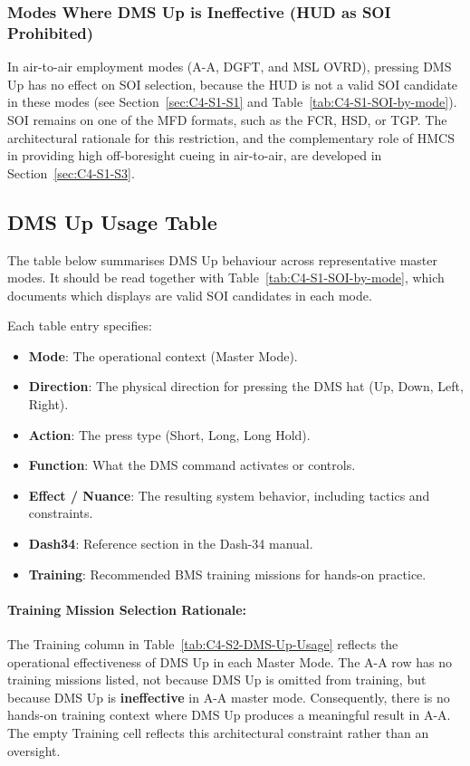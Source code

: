 \documentclass[11pt, a4paper, twoside]{report}
\begin{document}
\subsubsection{Modes Where DMS Up is Ineffective (HUD as SOI Prohibited)}
\label{sec:C4-S2-S1-S2}

In air-to-air employment modes (A-A, DGFT, and MSL OVRD), pressing DMS Up has no effect on SOI selection, because the HUD is not a valid SOI candidate in these modes (see Section~\ref{sec:C4-S1-S1} and Table~\ref{tab:C4-S1-SOI-by-mode}). SOI remains on one of the MFD formats, such as the FCR, HSD, or TGP. The architectural rationale for this restriction, and the complementary role of HMCS in providing high off-boresight cueing in air-to-air, are developed in Section~\ref{sec:C4-S1-S3}.

\subsection{DMS Up Usage Table}
\label{sec:C4-S2-S2}

The table below summarises DMS Up behaviour across representative master modes. It should be read together with Table~\ref{tab:C4-S1-SOI-by-mode}, which documents which displays are valid SOI candidates in each mode.

Each table entry specifies:

\begin{itemize}
	\item \textbf{Mode}: The operational context (Master Mode).
	\item \textbf{Direction}: The physical direction for pressing the DMS hat (Up, Down, Left, Right).
	\item \textbf{Action}: The press type (Short, Long, Long Hold).
	\item \textbf{Function}: What the DMS command activates or controls.
	\item \textbf{Effect / Nuance}: The resulting system behavior, including tactics and constraints.
	\item \textbf{Dash34}: Reference section in the Dash-34 manual.
	\item \textbf{Training}: Recommended BMS training missions for hands-on practice.
\end{itemize}

\paragraph{Training Mission Selection Rationale:} The Training column in Table~\ref{tab:C4-S2-DMS-Up-Usage} reflects the operational effectiveness of DMS Up in each Master Mode. The A-A row has no training missions listed, not because DMS Up is omitted from training, but because DMS Up is \textbf{ineffective} in A-A master mode. Consequently, there is no hands-on training context where DMS Up produces a meaningful result in A-A. The empty Training cell reflects this architectural constraint rather than an oversight.
\end{document}
